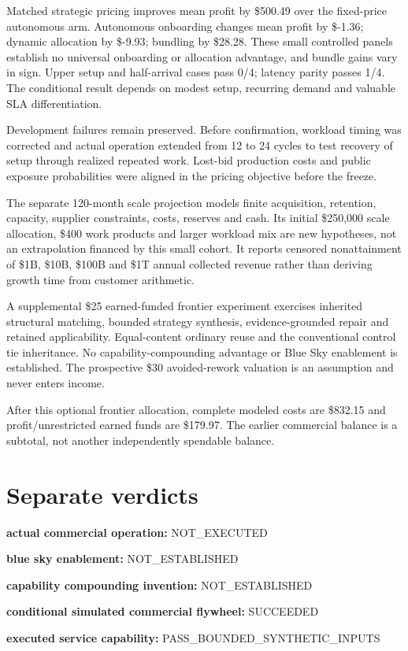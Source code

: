 \documentclass[10pt]{article}
\begin{document}
Matched strategic pricing improves mean profit by \$500.49 over the fixed-price autonomous arm. Autonomous onboarding changes mean profit by \$-1.36; dynamic allocation by \$-9.93; bundling by \$28.28. These small controlled panels establish no universal onboarding or allocation advantage, and bundle gains vary in sign. Upper setup and half-arrival cases pass 0/4; latency parity passes 1/4. The conditional result depends on modest setup, recurring demand and valuable SLA differentiation.

Development failures remain preserved. Before confirmation, workload timing was corrected and actual operation extended from 12 to 24 cycles to test recovery of setup through realized repeated work. Lost-bid production costs and public exposure probabilities were aligned in the pricing objective before the freeze.

The separate 120-month scale projection models finite acquisition, retention, capacity, supplier constraints, costs, reserves and cash. Its initial \$250,000 scale allocation, \$400 work products and larger workload mix are new hypotheses, not an extrapolation financed by this small cohort. It reports censored nonattainment of \$1B, \$10B, \$100B and \$1T annual collected revenue rather than deriving growth time from customer arithmetic.

A supplemental \$25 earned-funded frontier experiment exercises inherited structural matching, bounded strategy synthesis, evidence-grounded repair and retained applicability. Equal-content ordinary reuse and the conventional control tie inheritance. No capability-compounding advantage or Blue Sky enablement is established. The prospective \$30 avoided-rework valuation is an assumption and never enters income.

After this optional frontier allocation, complete modeled costs are \$832.15 and profit/unrestricted earned funds are \$179.97. The earlier commercial balance is a subtotal, not another independently spendable balance.

\section*{Separate verdicts}
\textbf{actual commercial operation:} NOT\_EXECUTED\par
\textbf{blue sky enablement:} NOT\_ESTABLISHED\par
\textbf{capability compounding invention:} NOT\_ESTABLISHED\par
\textbf{conditional simulated commercial flywheel:} SUCCEEDED\par
\textbf{executed service capability:} PASS\_BOUNDED\_SYNTHETIC\_INPUTS\par
\end{document}
